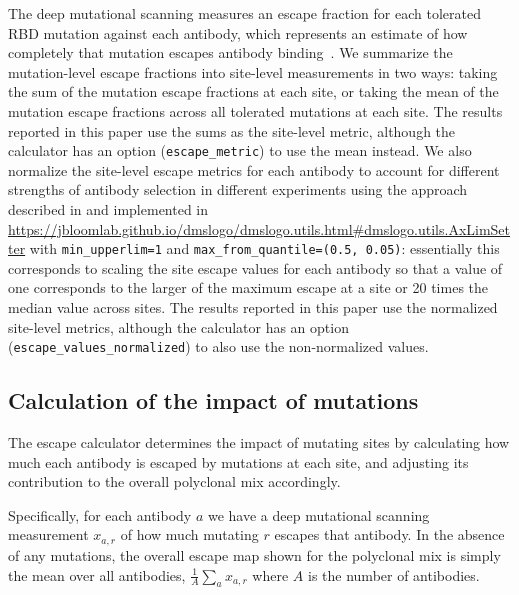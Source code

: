 \documentclass[9pt,twocolumn,twoside]{gsajnl_modified}
\begin{document}
{The deep mutational scanning measures an escape fraction for each tolerated RBD mutation against each antibody, which represents an estimate of how completely that mutation escapes antibody binding~\citep{greaney2021complete}.
We summarize the mutation-level escape fractions into site-level measurements in two ways: taking the sum of the mutation escape fractions at each site, or taking the mean of the mutation escape fractions across all tolerated mutations at each site.
The results reported in this paper use the sums as the site-level metric, although the calculator has an option (\texttt{escape\_metric}) to use the mean instead.
We also normalize the site-level escape metrics for each antibody to account for different strengths of antibody selection in different experiments using the approach described in \citet{greaney2021comprehensive} and implemented in \url{https://jbloomlab.github.io/dmslogo/dmslogo.utils.html#dmslogo.utils.AxLimSetter} with \texttt{min\_upperlim=1} and \texttt{max\_from\_quantile=(0.5, 0.05)}: essentially this corresponds to scaling the site escape values for each antibody so that a value of one corresponds to the larger of the maximum escape at a site or 20 times the median value across sites.
The results reported in this paper use the normalized site-level metrics, although the calculator has an option (\texttt{escape\_values\_normalized}) to also use the non-normalized values.

\subsection{Calculation of the impact of mutations}
The escape calculator determines the impact of mutating sites by calculating how much each antibody is escaped by mutations at each site, and adjusting its contribution to the overall polyclonal mix accordingly.

Specifically, for each antibody $a$ we have a deep mutational scanning measurement $x_{a,r}$ of how much mutating $r$ escapes that antibody.
In the absence of any mutations, the overall escape map shown for the polyclonal mix is simply the mean over all antibodies, $\frac{1}{A}\sum_a x_{a,r}$ where $A$ is the number of antibodies.

}
\end{document}
